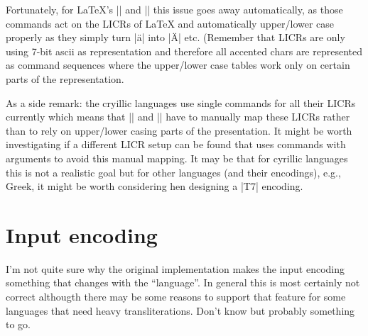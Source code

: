 \documentclass{ltxdoc}
\begin{document}
Fortunately, for \LaTeX{}'s |\MakeUppercase| and |\MakeLowercase| this
issue goes away automatically, as those commands act on the LICRs of
\LaTeX{} and automatically upper/lower case properly as they simply
turn |\"a| into |\"A| etc. (Remember that LICRs are only using 7-bit
ascii as representation and therefore all accented chars are
represented as command sequences where the upper/lower case tables
work only on certain parts of the representation.

As a side remark: the cryillic languages use single commands for all
their LICRs currently which means that |\MakeUppercase| and
|\MakeLowercase| have to manually map these LICRs rather than to rely
on upper/lower casing parts of the presentation. It might be worth
investigating if a different LICR setup can be found that uses
commands with arguments to avoid this manual mapping. It may be that
for cyrillic  languages this is not a realistic goal but for other
languages (and their encodings), e.g., Greek, it might be worth
considering hen designing a |T7| encoding.


\section{Input encoding}

I'm not quite sure why the original implementation makes the input
encoding something that changes with the ``language''. In general this
is most certainly not correct althougth there may be some reasons to
support that feature for some languages that need heavy
transliterations. Don't know but probably something to go.
\end{document}
